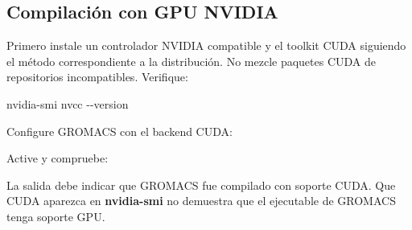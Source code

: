 \documentclass[
  spanish,
  11pt,
  a4paper]{article}
\newenvironment{Shaded}{\begin{snugshade}}{\end{snugshade}}
\newcommand{\AttributeTok}[1]{\textcolor[rgb]{0.13,0.29,0.53}{#1}}
\newcommand{\BuiltInTok}[1]{#1}
\newcommand{\ExtensionTok}[1]{#1}
\newcommand{\FunctionTok}[1]{\textcolor[rgb]{0.13,0.29,0.53}{\textbf{#1}}}
\newcommand{\NormalTok}[1]{#1}
\newcommand{\OperatorTok}[1]{\textcolor[rgb]{0.81,0.36,0.00}{\textbf{#1}}}
\newcommand{\StringTok}[1]{\textcolor[rgb]{0.31,0.60,0.02}{#1}}
\newcommand{\VariableTok}[1]{\textcolor[rgb]{0.00,0.00,0.00}{#1}}
\begin{document}
\subsection{Compilación con GPU
NVIDIA}\label{compilaciuxf3n-con-gpu-nvidia}

Primero instale un controlador NVIDIA compatible y el toolkit CUDA
siguiendo el método correspondiente a la distribución. No mezcle
paquetes CUDA de repositorios incompatibles. Verifique:

\begin{Shaded}
\begin{Highlighting}[]
\ExtensionTok{nvidia{-}smi}
\ExtensionTok{nvcc} \AttributeTok{{-}{-}version}
\end{Highlighting}
\end{Shaded}

Configure GROMACS con el backend CUDA:

\begin{Shaded}
\end{Shaded}

Active y compruebe:

\begin{Shaded}
\end{Shaded}

La salida debe indicar que GROMACS fue compilado con soporte CUDA. Que
CUDA aparezca en \textbf{nvidia-smi} no demuestra que el ejecutable de
GROMACS tenga soporte GPU.
\end{document}

